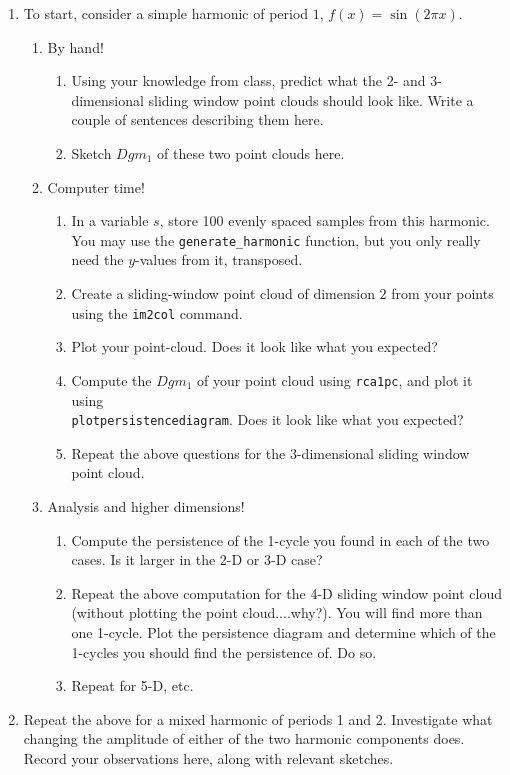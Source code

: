 \documentclass[12pt,twoside]{article}
\begin{document}
\begin{enumerate}
   \item To start, consider a simple harmonic of period $1$, $f(x)=\sin(2\pi x)$.
   \begin{enumerate}
     \item By hand!
     \begin{enumerate}
     \item Using your knowledge from class, predict what the 2- and 3-dimensional sliding window point clouds should look like.  Write a couple of sentences describing them here.\vspace{0.75in}
     \item Sketch $Dgm_1$ of these two point clouds here.\vfill
    \end{enumerate}
    
     \item Computer time!
     \begin{enumerate}
        \item In a variable $s$, store 100 evenly spaced samples from this harmonic.  You may use the \verb|generate_harmonic| function, but you only really need the $y$-values from it, transposed.\\
        \item Create a sliding-window point cloud of dimension $2$ from your points using the \verb|im2col| command.\\
        \item Plot your point-cloud.  Does it look like what you expected? \\
        \item Compute the $Dgm_1$ of your point cloud using \verb|rca1pc|, and plot it using\\ \texttt{plotpersistencediagram}. Does it look like what you expected?\\
        \item Repeat the above questions for the 3-dimensional sliding window point cloud.
     \end{enumerate}
     \pagebreak
     \item Analysis and higher dimensions!
     \begin{enumerate}
        \item Compute the persistence of the 1-cycle you found in each of the two cases.  Is it larger in the 2-D or 3-D case?\vfill
        \item Repeat the above computation for the 4-D sliding window point cloud (without plotting the point cloud....why?).  You will find more than one 1-cycle.  Plot the persistence diagram and determine which of the 1-cycles you should find the persistence of.  Do so.\vfill
        \item Repeat for 5-D, etc.\vfill\vfill
     \end{enumerate}

   
  \end{enumerate}
  \item Repeat the above for a mixed harmonic of periods 1 and 2.  Investigate what changing the amplitude of either of the two harmonic components does.  Record your observations here, along with relevant sketches.\vfill\vfill\vfill\vfill
\end{enumerate}
\end{document}
